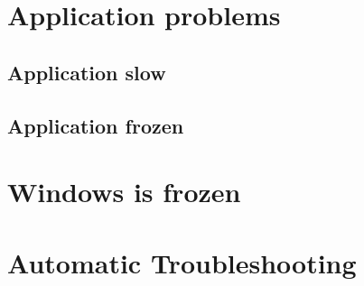 \documentclass[a4paper,12pt,twoside,titlepage]{article}
\begin{document}
\section{Application problems}
\subsection{Application slow}
\subsection{Application frozen}

\section{Windows is frozen}

\section{Automatic Troubleshooting}



\printindex
\end{document}
